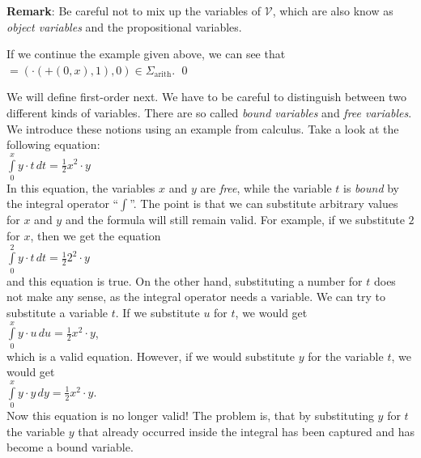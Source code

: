 \noindent
\textbf{Remark}: Be careful not to mix up the variables of $\mathcal{V}$, which are also know as
\emph{object variables} and the propositional variables.

\example
If we continue the example given above, we can see that 
\\[0.2cm]
\hspace*{1.3cm} 
$\mathtt{=}(\cdot(\mathtt{+}(0,x),1),0) \in \Sigma_\mathrm{arith}$. \qed
\vspace{0.3cm}

\noindent
We will define first-order \formulae next.  We have to be careful to distinguish between two
different kinds of variables.  There are so called \emph{bound variables} and \emph{free variables}.
We introduce these notions using an example from calculus.
Take a look at the following equation: \\[0.2cm]
\hspace*{1.3cm} $\int\limits_{0}^{x} y \cdot  t\, d t = \frac{1}{2} x^2 \cdot  y$ \\[0.2cm]
In this equation, the variables $x$ and $y$ are \emph{free}, while the variable $t$ is \emph{bound}
by the integral operator ``$\int$''.  The point is that we can substitute arbitrary values for
 $x$ and $y$ and the formula will still remain valid.
For example, if we substitute $2$ for  $x$, then we get the equation \\[0.2cm]
\hspace*{1.3cm}  $\int\limits_{0}^{2} y \cdot  t\, d t = \frac{1}{2} 2^2 \cdot  y$ 
\\[0.2cm]
and this equation is true.  On the other hand, substituting a number for $t$ does not make any
sense, as the integral operator needs a variable.  We can try to substitute a variable $t$.
If we substitute $u$ for $t$, we would get
\\[0.2cm]
\hspace*{1.3cm} $\int\limits_{0}^{x} y \cdot  u\, d u = \frac{1}{2} x^2 \cdot  y$, 
\\[0.2cm]
which is a valid equation.  However, if we would substitute $y$ for the variable $t$, we would get
 \\[0.2cm]
\hspace*{1.3cm}  $\int\limits_{0}^{x} y \cdot  y\, d y = \frac{1}{2} x^2 \cdot  y$. \\[0.2cm]
Now this equation is no longer valid!  The problem is, that by substituting $y$ for $t$ the variable
$y$ that already occurred inside the integral has been captured and has become a bound variable.


